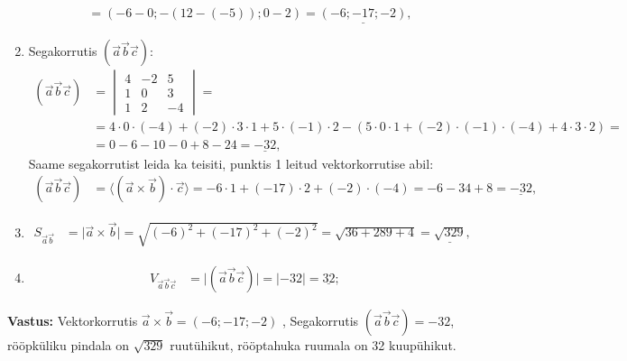 \documentclass[10pt, a4paper]{article}
\begin{document}
\begin{enumerate}
\begin{align}
                    &= (-6 - 0; -(12 - (-5)); 0 - 2) = \underline{(-6; -17; -2)},
                \end{align}
            \item Segakorrutis $(\vec{a} \vec{b} \vec{c})$:
                \begin{align}
                    \nonumber
                    (\vec{a} \vec{b} \vec{c}) &=
                    \begin{vmatrix}
                        4 & -2 & 5 \\
                        1 & 0 & 3 \\
                        1 & 2 & -4
                    \end{vmatrix} = \\ \nonumber
                    &= 4 \cdot 0 \cdot (-4) + (-2) \cdot 3 \cdot 1 + 5 \cdot (-1) \cdot 2 - (5 \cdot 0 \cdot 1 + (-2) \cdot (-1) \cdot (-4) + 4 \cdot 3 \cdot 2) = \\ \nonumber
                    &= 0 - 6 - 10 - 0 + 8 - 24 = \underline{-32},
                \end{align}
                Saame segakorrutist leida ka teisiti, punktis 1 leitud vektorkorrutise abil:
                \begin{align}
                    \nonumber
                    (\vec{a} \vec{b} \vec{c}) &= \langle (\vec{a} \times \vec{b}) \cdot \vec{c} \rangle = -6 \cdot 1 + (-17) \cdot 2 + (-2) \cdot (-4) = -6 - 34 + 8 = \underline{-32},
                \end{align}
            \item
                \begin{align}
                    \nonumber
                    S_{\vec{a}\vec{b}} &= \lvert \vec{a} \times \vec{b} \rvert = \sqrt{(-6)^2 + (-17)^2 + (-2)^2} = \sqrt{36 + 289 + 4} = \underline{\sqrt{329}},
                \end{align}
            \item
                \begin{align}
                    \nonumber
                    V_{\vec{a}\vec{b}\vec{c}} &= \lvert (\vec{a} \vec{b} \vec{c}) \rvert = \lvert -32 \rvert = \underline{32};
                \end{align}
            \end{enumerate}
        \textbf{Vastus: } Vektorkorrutis $\vec{a} \times \vec{b} = (-6; -17; -2)$ , Segakorrutis $(\vec{a} \vec{b} \vec{c}) = -32$, rööpküliku pindala on $\sqrt{329}$ ruutühikut, rööptahuka ruumala on 32 kuupühikut.
\end{document}
